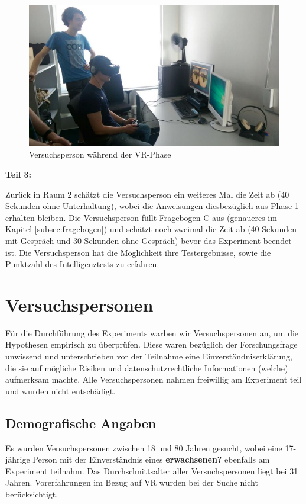 \documentclass{Bericht}
\begin{document}
\begin{figure}[H]
	\centering    
	\includegraphics[height=\textheight, width=\linewidth, keepaspectratio]{../Bilder/v.jpg}
	\caption{Versuchsperson während der VR-Phase}
	\label{img:versuchsperson-in-vr}
\end{figure}

\textbf{Teil 3:}

Zurück in Raum 2 schätzt die Versuchsperson ein weiteres Mal die Zeit ab (40 Sekunden ohne Unterhaltung), wobei die Anweisungen diesbezüglich aus Phase 1 erhalten bleiben. Die Versuchsperson füllt Fragebogen C aus (genaueres im Kapitel \ref{subsec:fragebogen}) und schätzt noch zweimal die Zeit ab (40 Sekunden mit Gespräch und 30 Sekunden ohne Gespräch) bevor das Experiment beendet ist. Die Versuchsperson hat die Möglichkeit ihre Testergebnisse, sowie die Punktzahl des Intelligenztests zu erfahren.
	\section{Versuchspersonen}
Für die Durchführung des Experiments warben wir Versuchspersonen an, um die Hypothesen empirisch zu überprüfen.
Diese waren bezüglich der Forschungsfrage unwissend und unterschrieben vor der Teilnahme eine Einverständniserklärung, die sie auf mögliche Risiken und datenschutzrechtliche Informationen (welche) aufmerksam machte. Alle Versuchspersonen nahmen freiwillig am Experiment teil und wurden nicht entschädigt. 

\subsection{Demografische Angaben}
Es wurden Versuchspersonen zwischen 18 und 80 Jahren gesucht, wobei eine 17-jährige Person mit der Einverständnis eines \textbf{erwachsenen?} ebenfalls am Experiment teilnahm. Das Durchschnittsalter aller Versuchspersonen liegt bei 31 Jahren. Vorerfahrungen im Bezug auf VR wurden bei der Suche nicht berücksichtigt.
\end{document}
